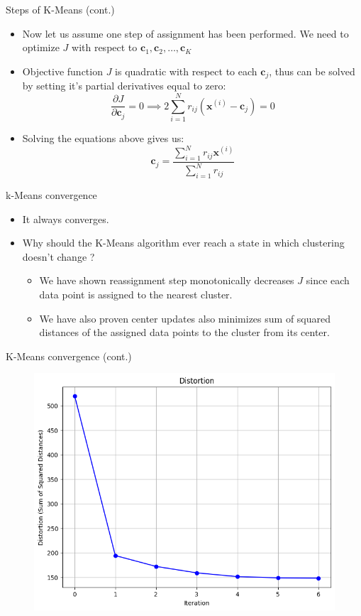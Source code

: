 \documentclass[serif, aspectratio=169]{beamer}
\begin{document}
\begin{frame}{Steps of K-Means (cont.)}
    \begin{itemize}
        \item Now let us assume one step of assignment has been performed. We need to optimize \( J \) with respect to \( \mathbf{c}_1, \mathbf{c}_2, \dots, \mathbf{c}_K \)
        \item Objective function \( J \) is quadratic with respect to each \( \mathbf{c}_j \), thus can be solved by setting it's partial derivatives equal to zero:
        \[ 
        \frac{\partial J}{\partial \mathbf{c}_j} = 0 \implies 2 \sum_{i=1}^{N} r_{ij} \left(\mathbf{x}^{(i)} - \mathbf{c}_j \right) = 0
        \]
        \item Solving the equations above gives us:
        \[ 
        \mathbf{c}_j = \frac{\sum_{i=1}^{N}{r_{ij}\mathbf{x}^{(i)}}}{\sum_{i=1}^{N} r_{ij}}
        \]
    \end{itemize}
\end{frame}

\begin{frame}{k-Means convergence}
    \begin{itemize}
        \item It always converges.
        \item Why should the K-Means algorithm ever reach a state in which clustering doesn't change ?
        \begin{itemize}
            \item We have shown reassignment step monotonically decreases \( J \) since each data point is assigned to the nearest cluster.
            \item We have also proven center updates also minimizes sum of squared distances of the assigned data points to the cluster from its center.
        \end{itemize}
    \end{itemize}
\end{frame}
\begin{frame}{K-Means convergence (cont.)}
    \begin{figure}
        \centering
        \includegraphics[scale=0.45]{pic/figs/distortion.png}
    \end{figure}
\end{frame}
\end{document}
